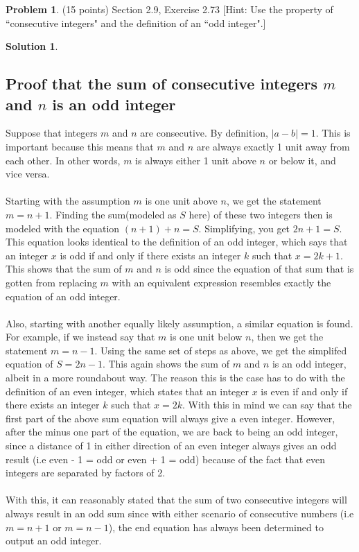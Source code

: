 \documentclass{article}
\theoremstyle{definition}
\newtheorem{problem}{Problem}
\newtheorem*{solution}{Solution}
\begin{document}
\newpage
\begin{problem} (15 points) Section 2.9, Exercise 2.73
[Hint: Use the property of ``consecutive integers" and the definition of an ``odd integer".]
\end{problem}
\begin{solution}
\hspace{1cm}
\subsection*{Proof that the sum of consecutive integers $m$ and $n$ is an odd integer}
Suppose that integers $m$ and $n$ are consecutive. By definition, $|a-b| = 1$. This is important because this means that $m$ and $n$ are always exactly 1 unit away from each other. In other words, $m$ is always either 1 unit above $n$ or below it, and vice versa.\\\\
Starting with the assumption $m$ is one unit above $n$, we get the statement $m = n+1$. Finding the sum(modeled as $S$ here) of these two integers then is modeled with the equation $(n+1) + n = S$. Simplifying, you get $2n +1 =S$. This equation looks identical to the definition of an odd integer, which says that an integer $x$ is odd if and only if there exists an integer $k$ such that $x = 2k +1$. This shows that the sum of $m$ and $n$ is odd since the equation of that sum that is gotten from replacing $m$ with an equivalent expression resembles exactly the equation of an odd integer.\\\\
Also, starting with another equally likely assumption, a similar equation is found. For example, if we instead say that $m$ is one unit below $n$, then we get the statement $m = n - 1$. Using the same set of steps as above, we get the simplifed equation of $S = 2n -1$. This again shows the sum of $m$ and $n$ is an odd integer, albeit in a more roundabout way. The reason this is the case has to do with the definition of an even integer, which states that an integer $x$ is even if and only if there exists an integer $k$ such that $x = 2k$. With this in mind we can say that the first part of the above sum equation will always give a even integer. However, after the minus one part of the equation, we are back to being an odd integer, since a distance of 1 in either direction of an even integer always gives an odd result  (i.e even - 1 = odd or even + 1 = odd) because of the fact that even integers are separated by factors of 2.\\\\
With this, it can reasonably stated that the sum of two consecutive integers will always result in an odd sum since with either scenario of consecutive numbers (i.e $m = n+1$ or $m = n-1$), the end equation has always been determined to output an odd integer.

\end{solution}
\end{document}
